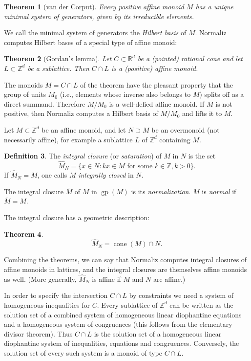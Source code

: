 \documentclass[12pt,a4paper]{scrartcl}
\newtheorem{theorem}{Theorem}
\theoremstyle{definition}
\newtheorem{definition}[theorem]{Definition}
\def\ZZ{{\mathbb Z}}
\def\RR{{\mathbb R}}
\DeclareMathOperator{\gp}{gp}
\DeclareMathOperator{\cone}{cone}
\begin{document}
\begin{theorem}[van der Corput]
	Every positive affine monoid $M$ has a unique minimal system of generators, given by its irreducible elements.
\end{theorem}

We call the minimal system of generators the \emph{Hilbert basis} of $M$. Normaliz computes Hilbert bases of a special type of affine monoid:

\begin{theorem}[Gordan's lemma]
	Let $C\subset\RR^d$ be a (pointed) rational cone and let $L\subset \ZZ^d$ be a sublattice. Then $C\cap L$ is a (positive) affine monoid.
\end{theorem}

The monoids $M=C\cap L$  of the theorem have the pleasant property that the group of units $M_0$ (i.e., elements whose inverse also belongs to $M$) splits off as a direct summand. Therefore $M/M_0$ is a well-defied affine monoid. If $M$ is not positive, then Normaliz computes a Hilbert basis of $M/M_0$ and lifts it to $M$. 

Let $M\subset \ZZ^d$ be an affine monoid, and let $N\supset M$ be an overmonoid (not necessarily affine), for example a sublattice $L$ of $\ZZ^d$ containing $M$.

\begin{definition}
	The \emph{integral closure} (or \emph{saturation}) of $M$ in $N$ is the set
	$$
	\widehat M_N=\{x\in N: kx\in M \text{ for some } k\in \ZZ, k>0\}.
	$$
	If $\widehat M_N=M$, one calls $M$ \emph{integrally closed} in $N$.
	
	The integral closure $\overline M$ of $M$ in $\gp(M)$ is its \emph{normalization}. $M$ is \emph{normal} if $\overline M=M$.
\end{definition}

The integral closure has a geometric description:

\begin{theorem}\label{incl_cone}
	$$
	\widehat M_N =\cone(M)\cap N.
	$$
\end{theorem}

Combining the theorems, we can say that Normaliz computes integral closures of affine monoids in lattices, and the integral closures are themselves affine monoids as well. (More generally, $\widehat M_N$ is affine if $M$ and $N$ are affine.)

In order to specify the intersection $C\cap L$ by constraints we need a system of homogeneous inequalities for $C$. Every sublattice of $\ZZ^d$ can be written as the solution set of a combined system of homogeneous linear diophantine equations and a homogeneous system of congruences (this follows from the elementary divisor theorem). Thus $C\cap L$ is the solution set of a homogeneous linear diophantine system of inequalities, equations and congruences. Conversely, the solution set of every such system is a monoid of type $C\cap L$.
\end{document}
